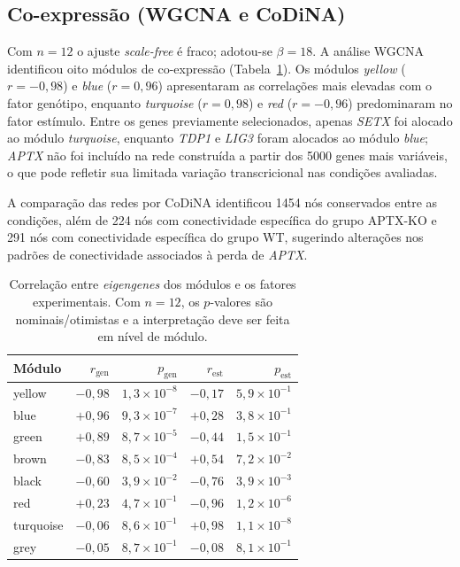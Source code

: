 \documentclass[10pt,letterpaper]{article}
\newcommand{\gene}[1]{\textit{#1}}
\begin{document}
\subsection*{Co-expressão (WGCNA e CoDiNA)}

Com \(n=12\) o ajuste \emph{scale-free} é fraco; adotou-se \(\beta=18\). A
análise WGCNA identificou oito módulos de co-expressão
(Tabela~\ref{tab:wgcna}). Os módulos \emph{yellow} (\(r=-0{,}98\)) e \emph{blue}
(\(r=0{,}96\)) apresentaram as correlações mais elevadas com o fator genótipo,
enquanto \emph{turquoise} (\(r=0{,}98\)) e \emph{red} (\(r=-0{,}96\))
predominaram no fator estímulo. Entre os genes previamente selecionados, apenas
\gene{SETX} foi alocado ao módulo \emph{turquoise}, enquanto \gene{TDP1} e
\gene{LIG3} foram alocados ao módulo \emph{blue}; \gene{APTX} não foi incluído na
rede construída a partir dos \num{5000} genes mais variáveis, o que pode refletir
sua limitada variação transcricional nas condições avaliadas.

A comparação das redes por CoDiNA identificou \num{1454} nós conservados entre as
condições, além de 224 nós com conectividade específica do grupo APTX-KO e 291
nós com conectividade específica do grupo WT, sugerindo alterações nos padrões de
conectividade associados à perda de \gene{APTX}.

\begin{table}[htbp]
\centering
\caption{Correlação entre \emph{eigengenes} dos módulos e os fatores
experimentais. Com \(n=12\), os \(p\)-valores são nominais/otimistas e a
interpretação deve ser feita em nível de módulo.}
\label{tab:wgcna}
\begin{tabular}{lrrrr}
\toprule
\textbf{Módulo} & \textbf{\(r_{\text{gen}}\)} & \textbf{\(p_{\text{gen}}\)}
& \textbf{\(r_{\text{est}}\)} & \textbf{\(p_{\text{est}}\)} \\
\midrule
yellow    & \(-0{,}98\) & \(1{,}3\times10^{-8}\) & \(-0{,}17\) & \(5{,}9\times10^{-1}\) \\
blue      & \(+0{,}96\) & \(9{,}3\times10^{-7}\) & \(+0{,}28\) & \(3{,}8\times10^{-1}\) \\
green     & \(+0{,}89\) & \(8{,}7\times10^{-5}\) & \(-0{,}44\) & \(1{,}5\times10^{-1}\) \\
brown     & \(-0{,}83\) & \(8{,}5\times10^{-4}\) & \(+0{,}54\) & \(7{,}2\times10^{-2}\) \\
black     & \(-0{,}60\) & \(3{,}9\times10^{-2}\) & \(-0{,}76\) & \(3{,}9\times10^{-3}\) \\
red       & \(+0{,}23\) & \(4{,}7\times10^{-1}\) & \(-0{,}96\) & \(1{,}2\times10^{-6}\) \\
turquoise & \(-0{,}06\) & \(8{,}6\times10^{-1}\) & \(+0{,}98\) & \(1{,}1\times10^{-8}\) \\
grey      & \(-0{,}05\) & \(8{,}7\times10^{-1}\) & \(-0{,}08\) & \(8{,}1\times10^{-1}\) \\
\bottomrule
\end{tabular}
\end{table}
\end{document}
